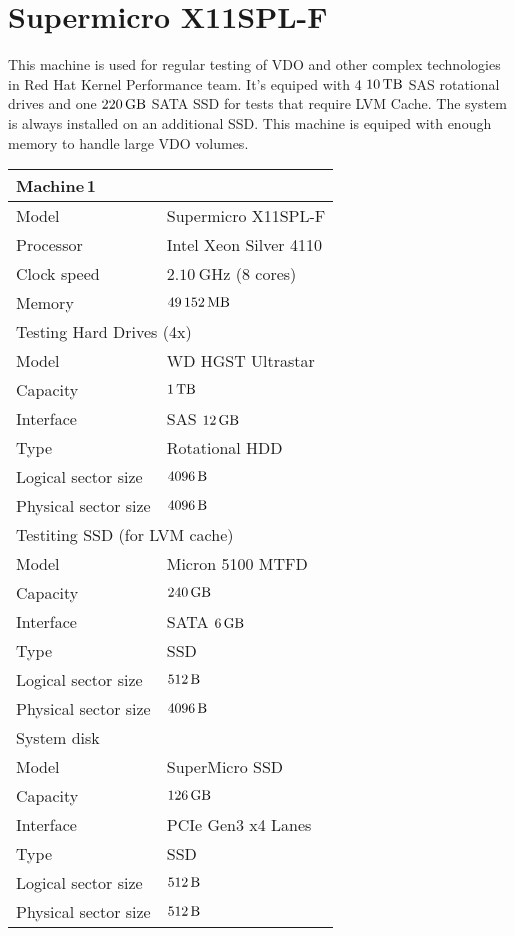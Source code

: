 \documentclass[
  color, %
  table, %
  lof,   %
  lot,   %
]{fithesis3}
\begin{document}
\section{Supermicro X11SPL-F}
This machine is used for regular testing of VDO and other complex technologies in Red Hat Kernel Performance team. It's equiped with 4 $\SI{10}{\tera\byte}$ SAS rotational drives and one $\SI{220}{\giga\byte}$ SATA SSD for tests that require LVM Cache. The system is always installed on an additional SSD. This machine is equiped with enough memory to handle large VDO volumes.
\clearpage
\begin{tabular}{|l|l|}
\hline
   \multicolumn{2}{|l|}{Machine\,1} \\ \hline %
    Model & Supermicro X11SPL-F\\
    \hline
    Processor & Intel Xeon Silver 4110  \\
    \hline
    Clock speed & $\SI{2.10}{\giga\hertz}$ (8 cores) \\
    \hline
    Memory & $\SI{49152}{\mega\byte}$ \\

\hline
   \multicolumn{2}{|l|}{Testing Hard Drives (4x)} \\ \hline %
    Model & WD HGST Ultrastar\\
    \hline
    Capacity & $\SI{1}{\tera\byte}$  \\
    \hline
    Interface & SAS $\SI{12}{\giga\byte}$  \\
    \hline
    Type & Rotational HDD \\
    \hline    
    Logical sector size & $\SI{4096}{\byte}$ \\    
    \hline    
    Physical sector size & $\SI{4096}{\byte}$ \\
    \hline
    
   \multicolumn{2}{|l|}{Testiting SSD (for LVM cache)} \\ \hline %
    Model & Micron 5100 MTFD \\
    \hline
    Capacity & $\SI{240}{\giga\byte}$  \\
    \hline
    Interface & SATA $\SI{6}{\giga\byte}$  \\
    \hline
    Type & SSD \\
    \hline    
    Logical sector size & $\SI{512}{\byte}$ \\    
    \hline    
    Physical sector size & $\SI{4096}{\byte}$ \\
    \hline
    
    \multicolumn{2}{|l|}{System disk} \\ \hline %
    Model & SuperMicro SSD  \\
    \hline
    Capacity & $\SI{126}{\giga\byte}$  \\
    \hline
    Interface & PCIe Gen3 x4 Lanes  \\
    \hline
    Type & SSD \\
    \hline    
    Logical sector size & $\SI{512}{\byte}$ \\    
    \hline    
    Physical sector size & $\SI{512}{\byte}$ \\
    \hline   
\end{tabular}
\end{document}
